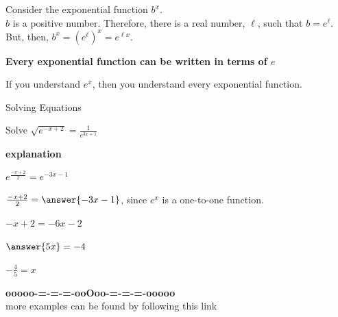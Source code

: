 \documentclass{ximera}
\begin{document}
\begin{conclusion}


Consider the exponential function $b^x$. \\

$b$ is a positive number.  Therefore, there is a real number, $\ell$, such that $b = e^{\ell}$. \\


But, then, $b^x = \left( e^{\ell} \right)^x = e^{\ell x}$.


\begin{center}
\textbf{\textcolor{red!70!black}{Every exponential function can be written in terms of $e$}}
\end{center}



If you understand $e^x$, then you understand every exponential function.

\end{conclusion}


















\begin{example} Solving Equations


Solve $\sqrt{e^{-x + 2}} = \frac{1}{e^{3x+1}}$


\textbf{\textcolor{red!75!green}{explanation}} 

$e^{\tfrac{-x + 2}{2}}= e^{-3x-1}$


$\frac{-x + 2}{2} = \answer{-3x-1}$, since $e^x$ is a one-to-one function.

$-x + 2 = -6x - 2$

$\answer{5x} = -4$


$-\frac{4}{5} = x$


\end{example}











\begin{center}
\textbf{\textcolor{green!50!black}{ooooo-=-=-=-ooOoo-=-=-=-ooooo}} \\

more examples can be found by following this link\\ 

\end{center}
\end{document}
